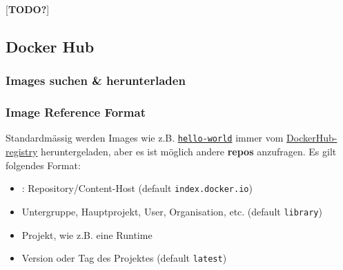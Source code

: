 \documentclass[
  10pt,
  a4paper,
]{article}
\newenvironment{Shaded}{}{}
\newcommand{\ExtensionTok}[1]{\textcolor[rgb]{0.84,0.23,0.29}{\textbf{#1}}}
\newcommand{\NormalTok}[1]{\textcolor[rgb]{0.14,0.16,0.18}{#1}}
\newcommand{\OperatorTok}[1]{\textcolor[rgb]{0.14,0.16,0.18}{#1}}
\providecommand{\tightlist}{%
  \setlength{\itemsep}{0pt}\setlength{\parskip}{0pt}}\usepackage{longtable,booktabs,array}
\begin{document}
\begin{multicols*}{2}
\textcolor{BrickRed}{[\textbf{TODO?}]}

\subsection{Docker Hub}\label{docker-hub}

\subsubsection{Images suchen \&
herunterladen}\label{images-suchen-herunterladen}

\begin{Shaded}
\end{Shaded}

\begin{Shaded}
\end{Shaded}

\subsubsection{Image Reference Format}\label{image-reference-format}

Standardmässig werden Images wie z.B.
\href{https://registry.hub.docker.com/_/hello-world}{\texttt{hello-world}}
immer vom \href{https://registry.hub.docker.com/}{DockerHub-registry}
heruntergeladen, aber es ist möglich andere \textbf{repos} anzufragen.
Es gilt folgendes Format:

\begin{center}
\texttt{\textbf{\color{BrickRed}{<repo>}}{\color{Gray}{/}}\textbf{\color{OliveGreen}{<source>}}{\color{Gray}{/}}\textbf{\color{NavyBlue}{<image>}}{\color{Gray}{/}}\textbf{\color{Periwinkle}{<tag>}}}

\end{center}

\begin{itemize}
\tightlist
\item
  \textbf{\texttt{\color{BrickRed}{<repo>}}}: Repository/Content-Host
  (default \texttt{index.docker.io})
\item
  \textbf{\texttt{\color{OliveGreen}{<source>}}} Untergruppe,
  Hauptprojekt, User, Organisation, etc. (default \texttt{library})
\item
  \textbf{\texttt{\color{NavyBlue}{<image>}}} Projekt, wie z.B. eine
  Runtime
\item
  \textbf{\texttt{\color{Periwinkle}{<tag>}}} Version oder Tag des
  Projektes (default \texttt{latest})
\end{itemize}


\end{multicols*}
\end{document}
